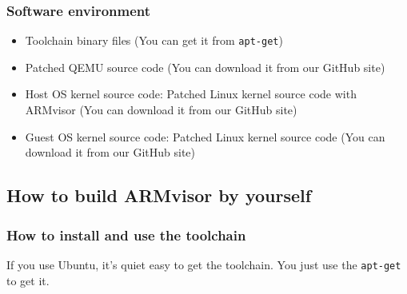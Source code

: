 \documentclass[12pt]{article}  %
\begin{document}
\subsubsection{Software environment}
\begin{itemize}
\item Toolchain binary files (You can get it from \texttt{apt-get})
\item Patched QEMU source code (You can download it from our GitHub site)
\item Host OS kernel source code: Patched Linux kernel source code with ARMvisor (You can download it from our GitHub site)
\item Guest OS kernel source code: Patched Linux kernel source code (You can download it from our GitHub site)
\end{itemize}





\subsection{How to build ARMvisor by yourself}

\subsubsection{How to install and use the toolchain}
If you use Ubuntu, it's quiet easy to get the toolchain. You just use the \texttt{apt-get} to get it.\newline\newline
{}
\end{document}
